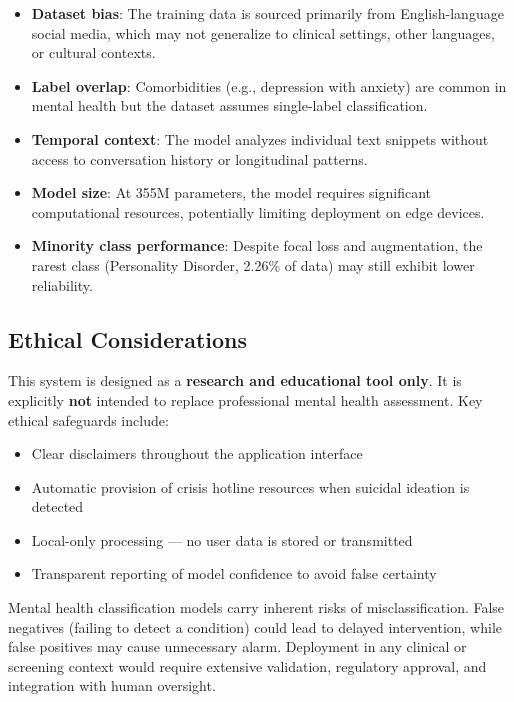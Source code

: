 \documentclass[conference, 10pt]{IEEEtran}
\begin{document}
\begin{itemize}[noitemsep]
    \item \textbf{Dataset bias}: The training data is sourced primarily from English-language social media, which may not generalize to clinical settings, other languages, or cultural contexts.
    \item \textbf{Label overlap}: Comorbidities (e.g., depression with anxiety) are common in mental health but the dataset assumes single-label classification.
    \item \textbf{Temporal context}: The model analyzes individual text snippets without access to conversation history or longitudinal patterns.
    \item \textbf{Model size}: At 355M parameters, the model requires significant computational resources, potentially limiting deployment on edge devices.
    \item \textbf{Minority class performance}: Despite focal loss and augmentation, the rarest class (Personality Disorder, 2.26\% of data) may still exhibit lower reliability.
\end{itemize}

\subsection{Ethical Considerations}

This system is designed as a \textbf{research and educational tool only}. It is explicitly \textbf{not} intended to replace professional mental health assessment. Key ethical safeguards include:

\begin{itemize}[noitemsep]
    \item Clear disclaimers throughout the application interface
    \item Automatic provision of crisis hotline resources when suicidal ideation is detected
    \item Local-only processing — no user data is stored or transmitted
    \item Transparent reporting of model confidence to avoid false certainty
\end{itemize}

Mental health classification models carry inherent risks of misclassification. False negatives (failing to detect a condition) could lead to delayed intervention, while false positives may cause unnecessary alarm. Deployment in any clinical or screening context would require extensive validation, regulatory approval, and integration with human oversight.
\end{document}
